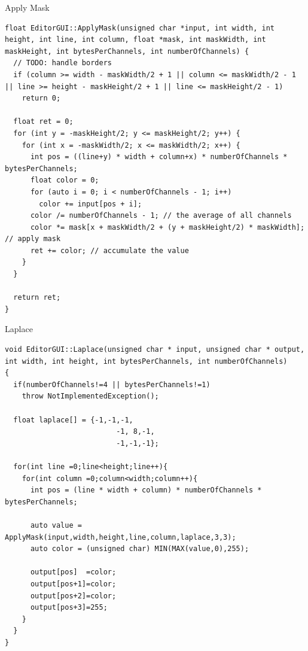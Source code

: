 \documentclass[a4paper]{sbgames}               %
\begin{document}
Apply Mask
\begin{lstlisting}
float EditorGUI::ApplyMask(unsigned char *input, int width, int height, int line, int column, float *mask, int maskWidth, int maskHeight, int bytesPerChannels, int numberOfChannels) {
  // TODO: handle borders
  if (column >= width - maskWidth/2 + 1 || column <= maskWidth/2 - 1 || line >= height - maskHeight/2 + 1 || line <= maskHeight/2 - 1)
    return 0;

  float ret = 0;
  for (int y = -maskHeight/2; y <= maskHeight/2; y++) {
    for (int x = -maskWidth/2; x <= maskWidth/2; x++) {
      int pos = ((line+y) * width + column+x) * numberOfChannels * bytesPerChannels;
      float color = 0;
      for (auto i = 0; i < numberOfChannels - 1; i++)
        color += input[pos + i];
      color /= numberOfChannels - 1; // the average of all channels
      color *= mask[x + maskWidth/2 + (y + maskHeight/2) * maskWidth]; // apply mask
      ret += color; // accumulate the value
    }
  }

  return ret;
}
\end{lstlisting}

\pagebreak
Laplace
\begin{lstlisting}
void EditorGUI::Laplace(unsigned char * input, unsigned char * output, int width, int height, int bytesPerChannels, int numberOfChannels)
{
  if(numberOfChannels!=4 || bytesPerChannels!=1)
    throw NotImplementedException();

  float laplace[] = {-1,-1,-1,
                          -1, 8,-1,
                          -1,-1,-1};

  for(int line =0;line<height;line++){
    for(int column =0;column<width;column++){
      int pos = (line * width + column) * numberOfChannels * bytesPerChannels;

      auto value = ApplyMask(input,width,height,line,column,laplace,3,3);
      auto color = (unsigned char) MIN(MAX(value,0),255);

      output[pos]  =color;
      output[pos+1]=color;
      output[pos+2]=color;
      output[pos+3]=255;
    }
  }
}
\end{lstlisting}
\end{document}
